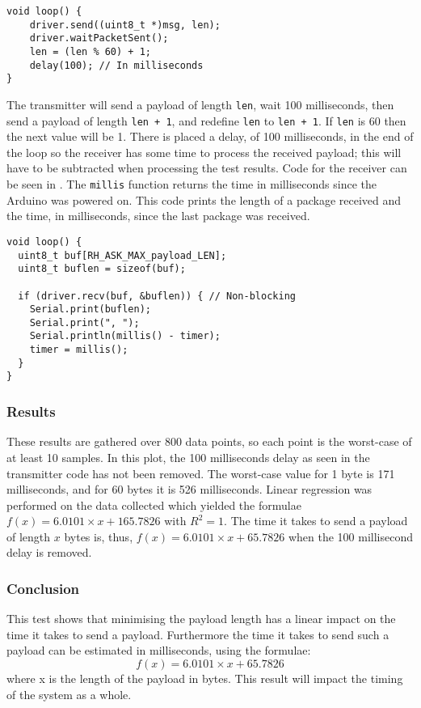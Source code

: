\begin{lstlisting}[style=customc,float,floatplacement=!h,caption={The core of the transmitter code.},label={lst:transtestcore}]
void loop() {
    driver.send((uint8_t *)msg, len);
    driver.waitPacketSent();
    len = (len % 60) + 1;
    delay(100); // In milliseconds 
}
\end{lstlisting}

The transmitter will send a payload of length \texttt{len}, wait 100 milliseconds, then send a payload of length \texttt{len + 1}, and redefine \texttt{len} to \texttt{len + 1}.
If \texttt{len} is 60 then the next value will be 1. 
There is placed a delay, of 100 milliseconds, in the end of the loop so the receiver has some time to process the received payload; this will have to be subtracted when processing the test results.
Code for the receiver can be seen in .
The \texttt{millis} function returns the time in milliseconds since the Arduino was powered on. 
This code prints the length of a package received and the time, in milliseconds, since the last package was received.

\begin{lstlisting}[style=customc,float,floatplacement=!h,caption={The core of the receiver code.},label={lst:recvtestcore}]
void loop() {
  uint8_t buf[RH_ASK_MAX_payload_LEN];
  uint8_t buflen = sizeof(buf);

  if (driver.recv(buf, &buflen)) { // Non-blocking
    Serial.print(buflen);
    Serial.print(", ");
    Serial.println(millis() - timer);
    timer = millis();
  }
}
\end{lstlisting}


\subsubsection*{Results}
These results are gathered over 800 data points, so each point is the worst-case of at least 10 samples. 
In this plot, the 100 milliseconds delay as seen in the transmitter code has not been removed.
The worst-case value for 1 byte is 171 milliseconds, and for 60 bytes it is 526 milliseconds. 
Linear regression was performed on the data collected which yielded the formulae $f(x)=6.0101 \times x + 165.7826$ with $R^2 = 1$. 
The time it takes to send a payload of length $x$ bytes is, thus, $f(x)=6.0101 \times x + 65.7826$ when the 100 millisecond delay is removed.

\subsubsection*{Conclusion}
This test shows that minimising the payload length has a linear impact on the time it takes to send a payload. 
Furthermore the time it takes to send such a payload can be estimated in milliseconds, using the formulae: 
\begin{equation}
f(x)=6.0101 \times x + 65.7826 
\label{eq:timeToSendFormular}   
\end{equation}
where x is the length of the payload in bytes. 
This result will impact the timing of the system as a whole.  
